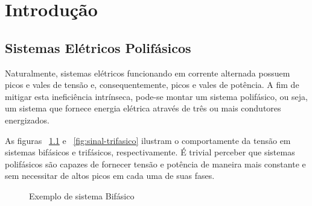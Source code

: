 \documentclass[12pt,a4paper,openany]{abntex2}
\begin{document}
	
\imprimircapa	
\imprimirfolhaderosto

\clearpage
\cleardoublepage
\cleardoublepage

\setcounter{page}{3}

\tableofcontents
\clearpage{\pagestyle{empty}\cleardoublepage}
	
\chapter{Introdução}

\section{Sistemas Elétricos Polifásicos}

Naturalmente, sistemas elétricos funcionando em corrente alternada possuem picos e vales de tensão e, consequentemente, picos e vales de potência. A fim de mitigar esta ineficiência intrínseca, pode-se montar um sistema polifásico, ou seja, um sistema que fornece energia elétrica através de três ou mais condutores energizados.

As figuras ~\ref{fig:sinal-bifasico} e ~\ref{fig:sinal-trifasico} ilustram o comportamente da tensão em sistemas bifásicos e trifásicos, respectivamente. É trivial perceber que sistemas polifásicos são capazes de fornecer tensão e potência de maneira mais constante e sem necessitar de altos picos em cada uma de suas fases.

\begin{figure}[!htp]
	\centering
		\caption{Exemplo de sistema Bifásico}
	\label{fig:sinal-bifasico}
\end{figure}
\end{document}
